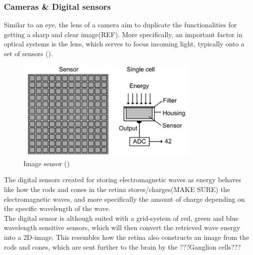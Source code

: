 \documentclass{article}
\newcommand{\goodcite}[1]{ {(\cite{#1})}}
\begin{document}
\subsubsection{Cameras \& Digital sensors}
Similar to an eye, the lens of a camera aim to duplicate the functionalities for getting a sharp and clear image(REF). More specifically, an important factor in optical systems is the lens, which serves to focus incoming light, typically onto a set of sensors\goodcite{IP}.\medskip\\ %

\begin{figure}[H] %
    \centering
    \includegraphics[width=0.8\textwidth]{img/sensor.png}
    \caption{Image sensor\goodcite{IP}}
    \label{fig:Image_sensor}
\end{figure}

The digital sensors created for storing electromagnetic waves as energy behaves like how the rods and cones in the retina stores/charges(MAKE SURE) the electromagnetic waves, and more specifically the amount of charge depending on the specific wavelength of the wave.\\The digital sensor is although suited with a grid-system of red, green and blue wavelength sensitive sensors, which will then convert the retrieved wave energy into a 2D-image. This resembles how the retina also constructs an image from the rods and cones, which are sent further to the brain by the ???Ganglion cells??? %


\end{document}
